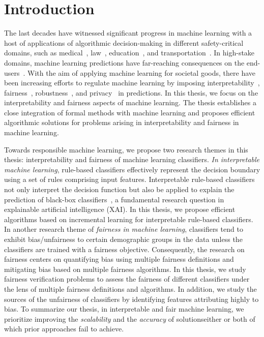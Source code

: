 \chapter{Introduction}

The last decades have witnessed significant progress in machine learning with a host of applications of algorithmic decision-making in different safety-critical domains, such as medical~\cite{erickson2017machine,kaissis2020secure,kononenko2001machine}, law~\cite{kumar2018law,surden2014machine}, education~\cite{luckin2018machine}, and transportation~\cite{peled2019model,zantalis2019review}. In high-stake domains,  machine learning predictions have far-reaching consequences on the end-users~\cite{eshete2021making}. With the aim of applying machine learning for societal goods, there have been increasing efforts to regulate machine learning by imposing interpretability~\cite{rudin2019stop}, fairness~\cite{barocas2017fairness}, robustness~\cite{rauber2017foolbox}, and privacy~\cite{papernot2016towards} in predictions. In this thesis, we focus on the interpretability and fairness aspects of machine learning. The thesis establishes a close integration of formal methods with machine learning and proposes efficient algorithmic solutions for problems arising in interpretability and fairness in machine learning.

Towards responsible machine learning, we propose two research themes in this thesis: interpretability and fairness of machine learning classifiers. \emph{In interpretable machine learning}, rule-based classifiers effectively represent the decision boundary using a set of rules comprising input features. Interpretable rule-based classifiers not only interpret the decision function but also be applied to explain the prediction of black-box classifiers~\cite{gill2020responsible,lundberg2017unified,moradi2021post,ribeiro2016should,slack2020fooling}, a fundamental research question in explainable artificial intelligence (XAI). In this thesis, we propose efficient algorithms based on incremental learning for interpretable rule-based classifiers. In another research theme of \emph{fairness in machine learning}, classifiers tend to exhibit bias/unfairness to certain demographic groups in the data unless the classifiers are trained with a fairness objective. Consequently, the research on fairness centers on quantifying bias using multiple fairness definitions and mitigating bias based on multiple fairness algorithms. In this thesis, we study fairness verification problems to assess the fairness of different classifiers under the lens of multiple fairness definitions and algorithms. In addition, we study the sources of the unfairness of classifiers by identifying  features attributing highly to bias. To summarize our thesis, in interpretable and fair machine learning, we prioritize improving the \emph{scalability} and the \emph{accuracy} of solutions\textemdash either or both of which prior approaches fail to achieve. 





